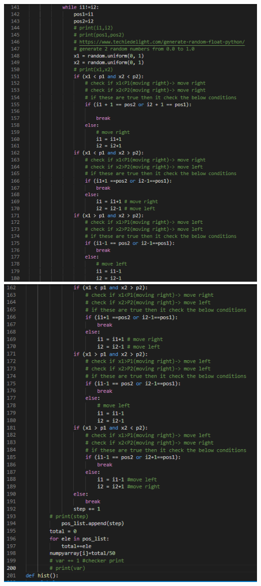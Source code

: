 \documentclass[answers]{exam}
\begin{document}
\begin{framed}
\begin{center}
\includegraphics[scale=1]{task1.3_b.PNG}\\
\includegraphics[scale=1]{task1.3_c.PNG}\\

\end{center}
\end{framed}
\end{document}
